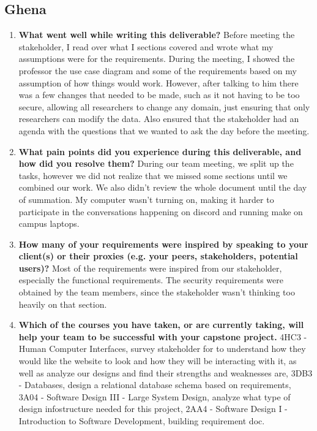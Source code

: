 \subsection*{Ghena}

\begin{enumerate}
  \item \textbf{What went well while writing this deliverable?}
  Before meeting the stakeholder, I read over what I sections covered and wrote what my assumptions were for the requirements. During the meeting, I showed the professor the use case diagram and some of the requirements based on my assumption of how things would work. However, after talking to him there was a few changes that needed to be made, such as it not having to be too secure, allowing all researchers to change any domain, just ensuring that only researchers can modify the data. Also ensured that the stakeholder had an agenda with the questions that we wanted to ask the day before the meeting.
  \item \textbf{What pain points did you experience during this deliverable, and how did
  you resolve them?}
  During our team meeting, we split up the tasks, however we did not realize that we missed some sections until we combined our work. We also didn't review the whole document until the day of summation. My computer wasn't turning on, making it harder to participate in the conversations happening on discord and running make on campus laptops.
  \item \textbf{How many of your requirements were inspired by speaking to your
  client(s) or their proxies (e.g. your peers, stakeholders, potential users)?}
  Most of the requirements were inspired from our stakeholder, especially the functional requirements. The security requirements were obtained by the team members, since the stakeholder wasn't thinking too heavily on that section.
  \item \textbf{Which of the courses you have taken, or are currently taking, will help
  your team to be successful with your capstone project.}
  4HC3 - Human Computer Interfaces, survey stakeholder for to understand how they would like the website to look and how they will be interacting with it, as well as analyze our designs and find their strengths and weaknesses are, 3DB3 - Databases, design a relational database schema based on requirements, 3A04 - Software Design III - Large System Design, analyze what type of design infostructure needed for this project, 2AA4 - Software Design I - Introduction to Software Development, building requirement doc.

\end{enumerate}
